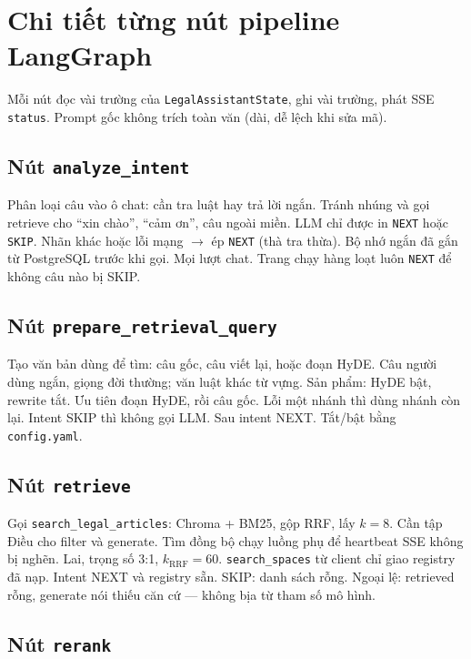 \section{Chi tiết từng nút pipeline LangGraph}

Mỗi nút đọc vài trường của \texttt{LegalAssistantState}, ghi vài trường, phát
SSE \texttt{status}. Prompt gốc không trích toàn văn (dài, dễ lệch khi sửa mã).

\subsection{Nút \texttt{analyze\_intent}}

\boncau
{Phân loại câu vào ô chat: cần tra luật hay trả lời ngắn.}
{Tránh nhúng và gọi retrieve cho ``xin chào'', ``cảm ơn'', câu ngoài miền.}
{LLM chỉ được in \texttt{NEXT} hoặc \texttt{SKIP}. Nhãn khác hoặc lỗi mạng
$\rightarrow$ ép \texttt{NEXT} (thà tra thừa). Bộ nhớ ngắn đã gắn từ PostgreSQL
trước khi gọi.}
{Mọi lượt chat. Trang chạy hàng loạt luôn \texttt{NEXT} để không câu nào bị SKIP.}

\subsection{Nút \texttt{prepare\_retrieval\_query}}

\boncau
{Tạo văn bản dùng để tìm: câu gốc, câu viết lại, hoặc đoạn HyDE.}
{Câu người dùng ngắn, giọng đời thường; văn luật khác từ vựng.}
{Sản phẩm: HyDE bật, rewrite tắt. Ưu tiên đoạn HyDE, rồi câu gốc. Lỗi một nhánh
thì dùng nhánh còn lại. Intent SKIP thì không gọi LLM.}
{Sau intent NEXT. Tắt/bật bằng \texttt{config.yaml}.}

\subsection{Nút \texttt{retrieve}}

\boncau
{Gọi \texttt{search\_legal\_articles}: Chroma + BM25, gộp RRF, lấy $k=8$.}
{Cần tập Điều cho filter và generate. Tìm đồng bộ chạy luồng phụ để heartbeat
SSE không bị nghẽn.}
{Lai, trọng số 3:1, $k_{\mathrm{RRF}}=60$. \texttt{search\_spaces} từ client chỉ
giao registry đã nạp.}
{Intent NEXT và registry sẵn. SKIP: danh sách rỗng. Ngoại lệ: retrieved rỗng,
generate nói thiếu căn cứ --- không bịa từ tham số mô hình.}

\subsection{Nút \texttt{rerank}}

